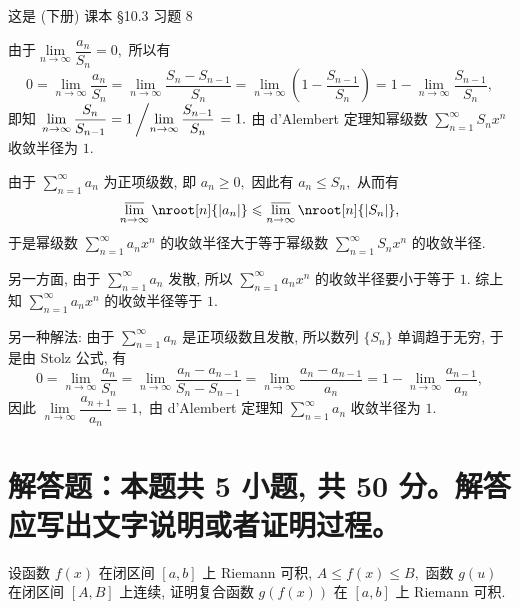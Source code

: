 \begin{solution}
这是 (下册) 课本 \S 10.3 习题 8

由于$\lim\limits_{n\to\infty} \dfrac{a_n}{S_n} = 0,$ 所以有
$$0 = \lim\limits_{n\to\infty} \dfrac{a_n}{S_n} = \lim\limits_{n\to\infty} \dfrac{S_n - S_{n-1}}{S_n} = \lim\limits_{n\to\infty} \left( 1 - \dfrac{S_{n-1}}{S_n} \right) = 1 - \lim\limits_{n\to\infty} \dfrac{S_{n-1}}{S_n},$$
即知 $\lim\limits_{n\to\infty} \dfrac{S_n}{S_{n-1}} = 1 \left/ \lim\limits_{n\to\infty} \dfrac{S_{n-1}}{S_n} \right. = 1.$ 由 d'Alembert 定理知幂级数 $\sum\limits_{n=1}^{\infty} S_n x^n$ 收敛半径为 $1.$

由于 $\sum\limits_{n=1}^{\infty} a_n$ 为正项级数, 即 $a_n \geqslant 0,$ 因此有 $a_n \leqslant S_n,$ 从而有
$$\varlimsup_{n\to\infty} \nroot[n]{\lvert a_n \rvert} \leqslant \varlimsup_{n\to\infty} \nroot[n]{\lvert S_n \rvert},$$
于是幂级数 $\sum\limits_{n=1}^{\infty} a_n x^n$ 的收敛半径大于等于幂级数 $\sum\limits_{n=1}^{\infty} S_n x^n$ 的收敛半径.

另一方面, 由于 $\sum\limits_{n=1}^{\infty} a_n$ 发散, 所以 $\sum\limits_{n=1}^{\infty} a_n x^n$ 的收敛半径要小于等于 $1.$ 综上知 $\sum\limits_{n=1}^{\infty} a_n x^n$ 的收敛半径等于 $1.$

另一种解法: 由于 $\sum\limits_{n=1}^{\infty} a_n$ 是正项级数且发散, 所以数列 $\{S_n\}$ 单调趋于无穷, 于是由 Stolz 公式, 有
$$0 = \lim\limits_{n\to\infty} \dfrac{a_n}{S_n} = \lim\limits_{n\to\infty} \dfrac{a_n-a_{n-1}}{S_n-S_{n-1}} = \lim\limits_{n\to\infty} \dfrac{a_n-a_{n-1}}{a_n} = 1 -\lim\limits_{n\to\infty} \dfrac{a_{n-1}}{a_n},$$
因此 $\lim\limits_{n\to\infty} \dfrac{a_{n+1}}{a_n} = 1,$ 由 d'Alembert 定理知 $\sum\limits_{n=1}^{\infty} a_n$ 收敛半径为 $1.$
\end{solution}


\section{解答题：本题共 5 小题, 共 50 分。解答应写出文字说明或者证明过程。}


\begin{question}[points = 8]
设函数 $f(x)$ 在闭区间 $[a, b]$ 上 Riemann 可积, $A \leqslant f(x) \leqslant B,$ 函数 $g(u)$ 在闭区间 $[A, B]$ 上连续, 证明复合函数 $g(f(x))$ 在 $[a, b]$ 上 Riemann 可积.

\end{question}

